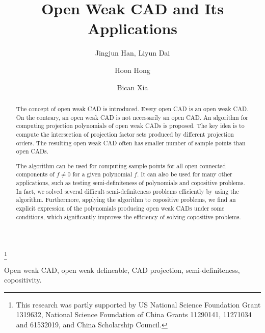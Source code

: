 \documentclass[amsthm]{elsart}
\begin{document}
\begin{frontmatter}

\title{\textbf{Open Weak CAD and Its Applications}}

\thanks{This research was partly supported by US National Science Foundation Grant 1319632, National Science Foundation of China Grants 11290141, 11271034 and 61532019, and China Scholarship Council.}

\author{Jingjun Han, Liyun Dai}
\address{LMAM $\&$ School of Mathematical Sciences\\ $\&$ Beijing International Center for Mathematical Research\\Peking University, Beijing 100871, China}

\author{Hoon Hong}
\address{Department of Mathematics, North Carolina State University, Raleigh NC 27695, USA}

\author{Bican Xia}
\address{LMAM $\&$ School of Mathematical Sciences, Peking University, Beijing 100871, China}


\begin{abstract}
The concept of open weak CAD is introduced. Every open CAD is an open weak CAD. On the contrary, an open weak CAD is not necessarily an open CAD. An algorithm for computing projection polynomials of open weak CADs is proposed. The key idea is to compute the intersection of projection factor sets produced by different projection orders. The resulting open weak CAD often has smaller number of sample points than open CADs.

The algorithm can be used for computing sample points for all open connected components of $ f\neq0$ for a given polynomial $f$. It can also be used for many other applications, such as testing semi-definiteness of polynomials and copositive problems. In fact, we solved several difficult semi-definiteness problems   efficiently by using the algorithm. Furthermore, applying the algorithm to copositive problems, we find an explicit expression of the polynomials producing open weak CADs under some conditions, which significantly improves the efficiency of solving copositive problems.




\end{abstract}
\begin{keyword}
Open weak CAD, open weak delineable, CAD projection, semi-definiteness, copositivity.
\end{keyword}

\end{frontmatter}
\end{document}
